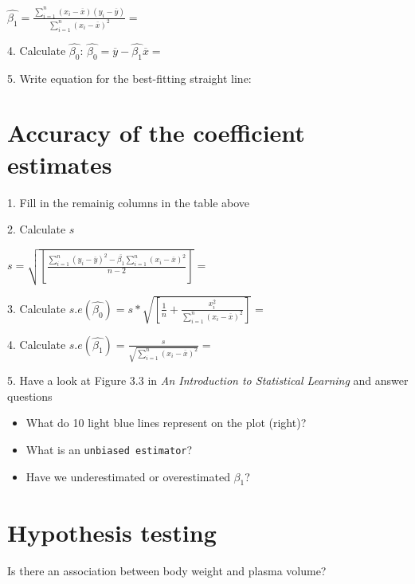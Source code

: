 \documentclass[12pt]{article}\usepackage[]{graphicx}\usepackage[]{color}
\begin{document}
$\hat{\beta_1}= \frac{\sum_{i=1}^{n}(x_i-\overline{x})(y_i-\overline{y})}{\sum_{i=1}^{n}(x_i-\overline{x})^2}=$ \newline
\vspace{0.5cm}

4. Calculate $\hat{\beta_0}$: \newline
\vspace{0.1cm} 
$\hat{\beta_0}=\overline{y}-\hat{\beta_1}\overline{x}=$ \newline

5. Write equation for the best-fitting straight line:



\section{Accuracy of the coefficient estimates}

1. Fill in the remainig columns in the table above
\vspace{1cm} 

2. Calculate $s$ \newline

$s=\sqrt{[\frac{\sum_{i=1}^{n}(y_i-\overline{y})^2-\overline{\beta_1}\sum_{i=1}^{n}(x_i-\overline{x})^2}{n-2}]}=$
\vspace{1cm} 

3. Calculate 
$s.e(\hat{\beta_0})=s*\sqrt{[\frac{1}{n}+\frac{x_i^2}{\sum_{i=1}^{n}(x_i-\overline{x})^2}]}=$
\vspace{1cm} 

4. Calculate
$s.e(\hat{\beta_1})=\frac{s}{\sqrt{\sum_{i=1}^{n}(x_i-\overline{x})^2}}=$
\vspace{0.2cm} 

5. Have a look at Figure 3.3 in \textit{An Introduction to Statistical Learning} and answer questions
\begin{itemize}
  \item What do 10 light blue lines represent on the plot (right)?
  \item What is an \texttt{unbiased estimator}?
  \item Have we underestimated or overestimated ${\beta_1}$?
\end{itemize}

\section{Hypothesis testing}
Is there an association between body weight and plasma volume? 
\end{document}
